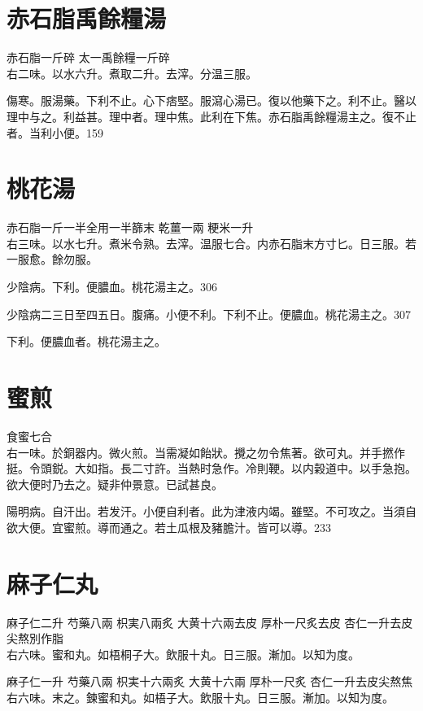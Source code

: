 \section{赤石脂禹餘糧湯}

赤石脂{\scriptsize 一斤碎} 太一禹餘糧{\scriptsize 一斤碎}\\
右二味。以水六升。煮取二升。去滓。分温三服。

傷寒。服湯藥。下利不止。心下痞堅。服瀉心湯已。復以他藥下之。利不止。醫以理中与之。利益甚。理中者。理中焦。此利在下焦。赤石脂禹餘糧湯主之。復不止者。当利小便。159

\section{桃花湯}

赤石脂{\scriptsize 一斤一半全用一半篩末} 乾薑{\scriptsize 一兩} 粳米{\scriptsize 一升}\\
右三味。以水七升。煮米令熟。去滓。温服七合。内赤石脂末方寸匕。日三服。若一服愈。餘勿服。

少陰病。下利。便膿血。桃花湯主之。306

少陰病二三日至四五日。腹痛。小便不利。下利不止。便膿血。桃花湯主之。307

下利。便膿血者。桃花湯主之。

\section{蜜煎}

食蜜{\scriptsize 七合}\\
右一味。於銅器内。微火煎。当需凝如飴狀。攪之勿令焦著。欲可丸。并手撚作挺。令頭鋭。大如指。長二寸許。当熱时急作。冷則鞕。以内榖道中。以手急抱。欲大便时乃去之。疑非仲景意。已試甚良。

陽明病。自汗出。若发汗。小便自利者。此为{\khaaitp 津液}内竭。雖堅。不可攻之。当須自欲大便。宜蜜煎。導而通之。若土瓜根及豬膽汁。皆可以導。233

\section{麻子仁丸}

麻子仁{\scriptsize 二升} 芍藥{\scriptsize 八兩} 枳実{\scriptsize 八兩炙} 大黄{\scriptsize 十六兩去皮} 厚朴{\scriptsize 一尺炙去皮} 杏仁{\scriptsize 一升去皮尖熬別作脂}\\
右六味。蜜和丸。如梧桐子大。飲服十丸。日三服。漸加。以知为度。{\zhaoben}

麻子仁{\scriptsize 一升} 芍藥{\scriptsize 八兩} 枳実{\scriptsize 十六兩炙} 大黄{\scriptsize 十六兩} 厚朴{\scriptsize 一尺炙} 杏仁{\scriptsize 一升去皮尖熬焦}\\
右六味。末之。鍊蜜和丸。如梧子大。飲服十丸。日三服。漸加。以知为度。{\wuben}

